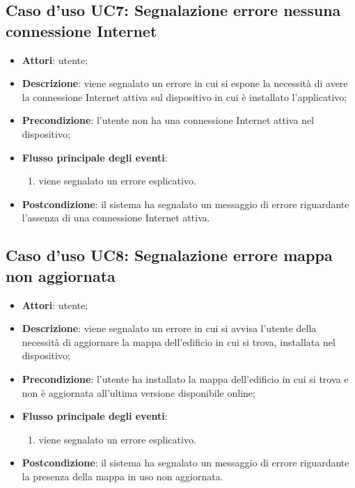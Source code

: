 \documentclass[../AnalisiDeiRequisiti.tex]{subfiles}
\begin{document}
\subsection{Caso d'uso UC7: Segnalazione errore nessuna connessione Internet}
\begin{itemize}
	\item \textbf{Attori}: utente;
	\item \textbf{Descrizione}: viene segnalato un errore in cui si espone la necessità di avere la connessione Internet attiva sul dispositivo in cui è installato l'applicativo; 
	\item \textbf{Precondizione}: l'utente non ha una connessione Internet attiva nel dispositivo;
	
	\item \textbf{Flusso principale degli eventi}:
	\begin{enumerate}
		\item viene segnalato un errore esplicativo.
		
	\end{enumerate}
	\item \textbf{Postcondizione}: il sistema ha segnalato un messaggio di errore riguardante l'assenza di una connessione Internet attiva.
\end{itemize}
\hypertarget{UC8}{}
\subsection{Caso d'uso UC8: Segnalazione errore mappa non aggiornata}
\begin{itemize}
	\item \textbf{Attori}: utente;
	\item \textbf{Descrizione}: viene segnalato un errore in cui si avvisa l'utente della necessità di aggiornare la mappa dell'edificio in cui si trova, installata nel dispositivo; 
	\item \textbf{Precondizione}: l'utente ha installato la mappa dell'edificio in cui si trova e non è aggiornata all'ultima versione disponibile online;
	
	\item \textbf{Flusso principale degli eventi}:
	\begin{enumerate}
		\item viene segnalato un errore esplicativo.
		
	\end{enumerate}
	\item \textbf{Postcondizione}: il sistema ha segnalato un messaggio di errore riguardante la presenza della mappa in uso non aggiornata.
\end{itemize}
\hypertarget{UC9}{}
\end{document}
